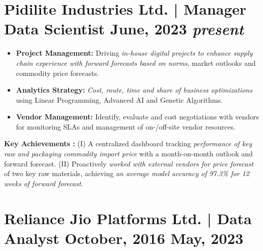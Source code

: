 
%

\section*{
    \SectionStylingFont \bfseries \textcolor{dBlue}{Pidilite Industries Ltd. | Manager Data Scientist} \hfill
    \small {\SectionStylingFontLight \bfseries \textcolor{lBlue}{
            \textbf{June, 2023} \textemdash \vspace{1pt} \textit{present}
    }}
}

\begin{itemize}
    \item \textbf{Project Management:} Driving \textit{in-house digital projects to enhance supply chain experience with forward forecasts based on norms}, market outlooks and commodity price forecasts.
    \item \textbf{Analytics Strategy:} \textit{Cost, route, time and share of business optimizations} using Linear Programming, Advanced AI and Genetic Algorithms.
    \item \textbf{Vendor Management:} Identify, evaluate and cost negotiations with vendors for monitoring SLAs and management of on-/off-site vendor resources.
\end{itemize}

\textbf{Key Achievements :} (I) A centralized dashboard tracking \textit{performance of key raw and packaging commodity import price} with a month-on-month outlook and forward forecast. (II) Proactively \textit{worked with external vendors for price forecast} of two key raw materials, achieving \textit{an average model accuracy of 97.3\% for 12 weeks of forward forecast}.

\section*{
	\SectionStylingFont \bfseries \textcolor{dBlue}{Reliance Jio Platforms Ltd. | Data Analyst} \hfill
	\small {\SectionStylingFontLight \bfseries \textcolor{lBlue}{
			\textbf{October, 2016} \textemdash \vspace{1pt} \textbf{May, 2023}
	}}
}

